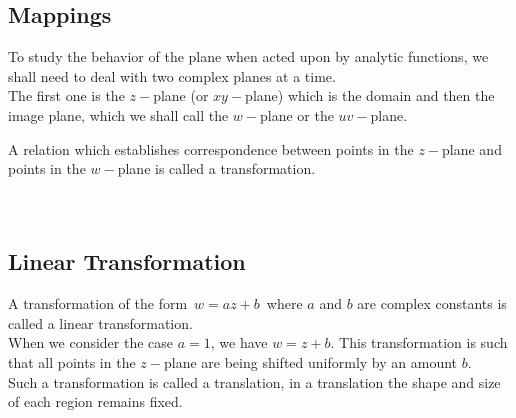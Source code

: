 \documentclass[11pt,a4paper]{article}
\theoremstyle{definition}
\begin{document}
{\color[wave]{485}\subsection{Mappings}}
To study the behavior of the plane when acted upon by analytic functions, we shall need to deal with two complex planes at a time.\\
The first one is the $z-$plane (or $xy-$plane) which is the domain and then the image plane, which we shall call the $w-$plane or the $uv-$plane.



\begin{figure}[H]
\centering
{}
\end{figure}


















A relation which establishes correspondence between points in the $z-$plane and points in the $w-$plane is called a transformation.\\\\\\








{\color[wave]{485}\subsection{Linear Transformation}}
A transformation of the form $\, w = az + b\,$ where $a$ and $b$ are complex constants is called a linear transformation.\\

When we consider the case $a = 1$, we have $w = z + b$. This transformation is such that all points in the $z-$plane are being shifted uniformly by an amount $b$.\\
Such a transformation is called a translation, in a translation the shape and size of each region remains fixed.\\
\end{document}
